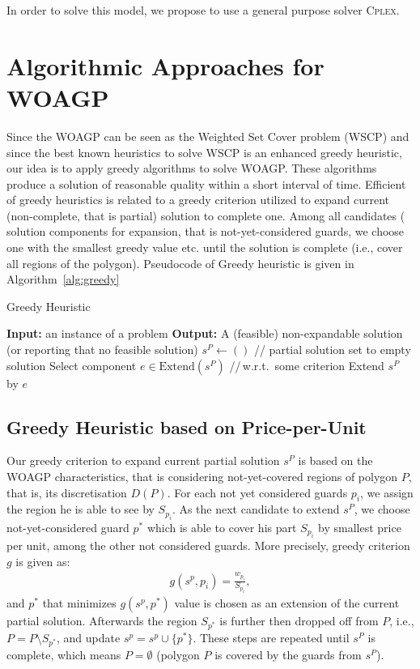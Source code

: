 \documentclass[runningheads,a4paper]{llncs}
\begin{document}
      In order to solve this model, we propose to use a general purpose solver \textsc{Cplex}.
     \section{Algorithmic Approaches for WOAGP}
          Since the WOAGP can be seen as the Weighted Set Cover problem (WSCP) and since the best known heuristics to solve WSCP is an enhanced greedy heuristic, our idea is to apply greedy algorithms to solve WOAGP. These algorithms produce a solution of reasonable quality within a short interval of time. Efficient of greedy heuristics is related to a greedy criterion utilized to expand current (non-complete, that is partial) solution to complete one. Among all candidates ( solution components for expansion, that is not-yet-considered guards, we choose one with the smallest greedy value etc. until the solution is complete (i.e., cover all regions of the polygon).
          Pseudocode of Greedy heuristic is given in Algorithm~\ref{alg:greedy}

          \begin{algorithm}[!t]
          	\caption{Greedy Heuristic}\label{alg:greedy}
          	\begin{algorithmic}[1]
          		\State \textbf{Input:} an instance of a problem
          		\State \textbf{Output:} A (feasible) non-expandable solution (or reporting that no feasible solution)
          		\State $s^{P} \gets ()$ \hspace{0.3cm}// partial solution set to empty solution
          		\State Select component $e \in  \text{Extend}(s^{P})$ \hspace{0.3cm}//\,w.r.t.\  some criterion
          		\State Extend $s^{P}$ by $e$
          		\EndWhile
          	\end{algorithmic}
          \end{algorithm}
      \subsection{Greedy Heuristic based on Price-per-Unit}
       Our greedy criterion to expand current partial solution $s^P$  is based on the WOAGP characteristics, that is considering not-yet-covered regions of polygon $P$, that is, its discretisation $D(P)$. For each not yet considered guards $p_i$, we assign the region he is able to see by $S_{p_i}$. As the next candidate to extend $s^P$, we choose not-yet-considered guard $p^*$ which is able to cover his part $S_{p_i}$ by smallest price per unit, among the other not considered guards. More precisely, greedy criterion $g$ is given as:
       \begin{align}
            g(s^p, p_i) = \frac{w_{p_i}}{S_{p_i}},
       \end{align}
       and $p^*$ that minimizes $g(s^p, p^*)$ value is chosen as an extension of the current partial solution.
       Afterwards the region $S_{p^*}$ is further then dropped off from $P$, i.e., $P=P \setminus S_{p^*}$, and update $s^p= s^p \cup \{p^*\}$.  These steps are repeated until $s^P$ is complete, which means $P = \emptyset$ (polygon $P$ is covered by the guards from $s^P$).
       
\end{document}
